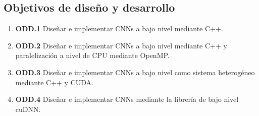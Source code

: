 \subsection{Objetivos de diseño y desarrollo}

\begin{enumerate}[label=\textbullet]
	\item \textbf{ODD.1} Diseñar e implementar CNNs a bajo nivel mediante C++.
	
	\item \textbf{ODD.2} Diseñar e implementar CNNs a bajo nivel mediante C++ y paralelización a nivel de CPU mediante OpenMP.

	\item \textbf{ODD.3} Diseñar e implementar CNNs a bajo nivel como sistema heterogéneo mediante C++ y CUDA.

	\item \textbf{ODD.4} Diseñar e implementar CNNs mediante la librería de bajo nivel cuDNN.		
	
\end{enumerate}
